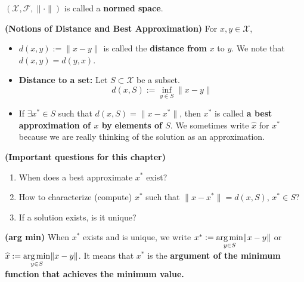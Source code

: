 \begin{definition}
 $(\mathcal{X}, \mathcal{F}, \|\cdot\|)$ is called a \textbf{normed space}.
\end{definition} 


\begin{notvocab}
\textbf{(Notions of Distance and Best Approximation)} For $x, y \in \mathcal{X}$,
\begin{itemize}
    \item  $d(x, y) := \|x-y\|$ is called the \textbf{distance from} $x$ to $y$. We note that  $d(x, y) = d(y, x)$.
    \item  \textbf{Distance to a set:} Let $S\subset \mathcal{X}$ be a subset.
    \begin{equation*}
        d(x, S):= \inf \limits_{y\in S}\|x-y\|
    \end{equation*}
    \item  If $\exists x^\ast  \in S$ such that $d(x, S) = \|x-x^\ast \|$, then $x^\ast $ is called \textbf{a best approximation of $x$ by} \textbf{elements of $S$}.  We sometimes write $\widehat{x}$ for $x^\ast $ because we are really thinking of the solution as an approximation.
\end{itemize}

\end{notvocab}

\begin{question} \textbf{(Important questions for this chapter)}
\begin{enumerate}
         \renewcommand{\labelenumi}{(\alph{enumi})}
        \setlength{\itemsep}{.1cm}
    \item When does a best approximate $x^\ast $ exist?
    \item How to characterize (compute) $x^\ast $ such that $\|x-x^\ast \| = d(x, S)$, $x^\ast \in S$?
    \item If a solution exists, is it unique?
\end{enumerate}
\end{question}


\begin{notation} \textbf{(arg min)}
When $x^\ast $ exists and is unique, we write $x^\ast  := {\underset{y \in S}{\operatorname*{arg\,min}}} \|x-y\|$ or  $\widehat{x} := {\underset{y \in S}{\operatorname*{arg\,min}}} \|x-y\|$. It means that $x^\ast$ is the \textbf{argument of the minimum function that achieves the minimum value.}
\end{notation}

